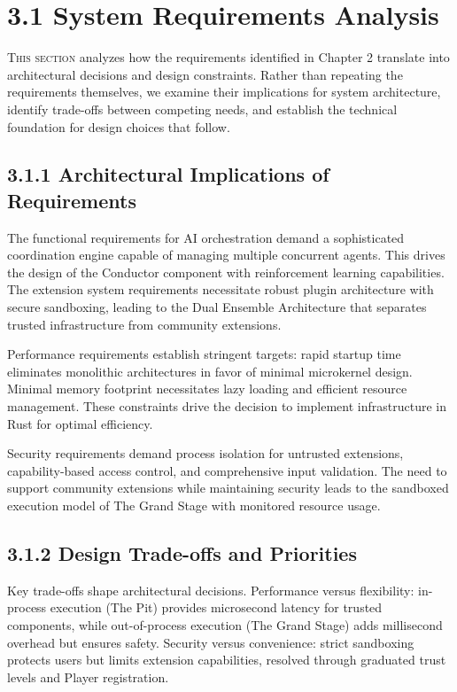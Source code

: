 
\clearpage
\section{3.1 System Requirements Analysis}
\label{sec:system-requirements-analysis}

\lettrine{T}{his section} analyzes how the requirements identified in Chapter 2 translate into architectural decisions and design constraints. Rather than repeating the requirements themselves, we examine their implications for system architecture, identify trade-offs between competing needs, and establish the technical foundation for design choices that follow.

\subsection*{3.1.1 Architectural Implications of Requirements}

The functional requirements for AI orchestration demand a sophisticated coordination engine capable of managing multiple concurrent agents. This drives the design of the Conductor component with reinforcement learning capabilities. The extension system requirements necessitate robust plugin architecture with secure sandboxing, leading to the Dual Ensemble Architecture that separates trusted infrastructure from community extensions.

Performance requirements establish stringent targets: rapid startup time eliminates monolithic architectures in favor of minimal microkernel design. Minimal memory footprint necessitates lazy loading and efficient resource management. These constraints drive the decision to implement infrastructure in Rust for optimal efficiency.

Security requirements demand process isolation for untrusted extensions, capability-based access control, and comprehensive input validation. The need to support community extensions while maintaining security leads to the sandboxed execution model of The Grand Stage with monitored resource usage.

\subsection*{3.1.2 Design Trade-offs and Priorities}

Key trade-offs shape architectural decisions. Performance versus flexibility: in-process execution (The Pit) provides microsecond latency for trusted components, while out-of-process execution (The Grand Stage) adds millisecond overhead but ensures safety. Security versus convenience: strict sandboxing protects users but limits extension capabilities, resolved through graduated trust levels and Player registration.

